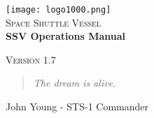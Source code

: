 \documentclass{article}
\begin{document}
\begin{titlepage}

\begin{center}

\texttt{[image: logo1000.png]}\\[1cm]

\textsc{\LARGE Space Shuttle Vessel}\\[1.5cm]

\huge \bfseries SSV Operations Manual\\[0.4cm]

\vfill

\textsc{\Large Version 1.7}\\[0.5cm]

\end{center}
\end{titlepage}


\newpage
\thispagestyle{empty}
\vspace*{\fill}
\begin{quote}
\centering
\textit{The dream is alive.}
\end{quote}
\begin{flushright}
John Young - STS-1 Commander
\end{flushright}
\vspace*{\fill}
\newpage





\newpage
\tableofcontents


\newpage

\newpage

\newpage

\newpage

\newpage

\newpage

\newpage

\newpage

\newpage

\newpage

\newpage

\newpage

\end{document}
